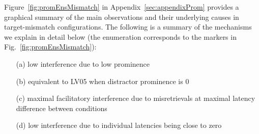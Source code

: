 \documentclass{cambridge7A}\usepackage[]{graphicx}\usepackage[]{color}
\begin{document}
Figure~\ref{fig:promEnsMismatch} in Appendix~\ref{sec:appendixProm} provides a graphical summary of the main observations and their underlying causes in target-mismatch configurations. 
The following is a summary of the mechanisms we explain in detail below (the enumeration corresponds to the markers in Fig.~\ref{fig:promEnsMismatch}):
\begin{enumerate}
	\item[(a)] low interference due to low prominence
 	\item[(b)] equivalent to LV05 when distractor prominence is $0$
 	\item[(c)] maximal facilitatory interference due to misretrievals at maximal latency difference between conditions
 	\item[(d)] low interference due to individual latencies being close to zero
\end{enumerate}
\end{document}
